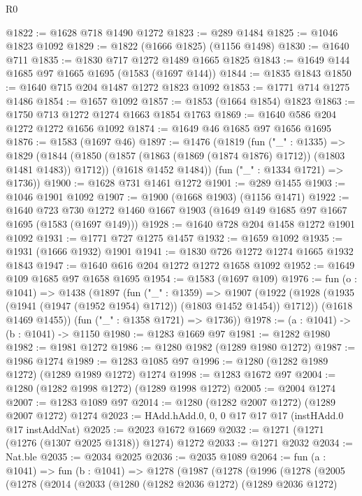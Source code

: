 \begin{lexlean}{R0}
\begin{coremodule}
@1822 := @1628 @718 @1490 @1272
@1823 := @289 @1484
@1825 := @1046 @1823 @1092
@1829 := @1822 (@1666 @1825) (@1156 @1498)
@1830 := @1640 @711
@1835 := @1830 @717 @1272 @1489 @1665 @1825
@1843 := @1649 @144 @1685 @97 @1665 @1695 (@1583 (@1697 @144))
@1844 := @1835 @1843
@1850 := @1640 @715 @204 @1487 @1272 @1823 @1092
@1853 := @1771 @714 @1275 @1486
@1854 := @1657 @1092
@1857 := @1853 (@1664 @1854) @1823
@1863 := @1750 @713 @1272 @1274 @1663 @1854 @1763
@1869 := @1640 @586 @204 @1272 @1272 @1656 @1092
@1874 := @1649 @46 @1685 @97 @1656 @1695
@1876 := @1583 (@1697 @46)
@1897 := @1476
    (@1819
      (fun ("_" : @1335) =>
      @1829
        (@1844 (@1850 (@1857 (@1863 (@1869 (@1874 @1876) @1712)) (@1803 @1481 @1483)) @1712))
        (@1618 @1452 @1484))
      (fun ("_" : @1334 @1721) => @1736))
@1900 := @1628 @731 @1461 @1272
@1901 := @289 @1455
@1903 := @1046 @1901 @1092
@1907 := @1900 (@1668 @1903) (@1156 @1471)
@1922 := @1640
    @723
    @730
    @1272
    @1460
    @1667
    @1903
    (@1649 @149 @1685 @97 @1667 @1695 (@1583 (@1697 @149)))
@1928 := @1640 @728 @204 @1458 @1272 @1901 @1092
@1931 := @1771 @727 @1275 @1457
@1932 := @1659 @1092
@1935 := @1931 (@1666 @1932) @1901
@1941 := @1830 @726 @1272 @1274 @1665 @1932 @1843
@1947 := @1640 @616 @204 @1272 @1272 @1658 @1092
@1952 := @1649 @109 @1685 @97 @1658 @1695
@1954 := @1583 (@1697 @109)
@1976 := fun (o : @1041) =>
  @1438
    (@1897
      (fun ("_" : @1359) =>
      @1907
        (@1922 (@1928 (@1935 (@1941 (@1947 (@1952 @1954) @1712)) (@1803 @1452 @1454)) @1712))
        (@1618 @1469 @1455))
      (fun ("_" : @1358 @1721) => @1736))
@1978 := (a : @1041) -> (b : @1041) -> @1150
@1980 := @1283 @1669 @97
@1981 := @1282 @1980
@1982 := @1981 @1272
@1986 := @1280 @1982 (@1289 @1980 @1272)
@1987 := @1986 @1274
@1989 := @1283 @1085 @97
@1996 := @1280 (@1282 @1989 @1272) (@1289 @1989 @1272) @1274
@1998 := @1283 @1672 @97
@2004 := @1280 (@1282 @1998 @1272) (@1289 @1998 @1272)
@2005 := @2004 @1274
@2007 := @1283 @1089 @97
@2014 := @1280 (@1282 @2007 @1272) (@1289 @2007 @1272) @1274
@2023 := HAdd.hAdd.{0, 0, 0} @17 @17 @17 (instHAdd.{0} @17 instAddNat)
@2025 := @2023 @1672 @1669
@2032 := @1271 (@1271 (@1276 (@1307 @2025 @1318)) @1274) @1272
@2033 := @1271 @2032
@2034 := Nat.ble
@2035 := @2034 @2025
@2036 := @2035 @1089
@2064 := fun (a : @1041) =>
  fun (b : @1041) =>
  @1278
    (@1987
      (@1278
        (@1996
          (@1278
            (@2005
              (@1278
                (@2014
                  (@2033
                    (@1280
                      (@1282 @2036 @1272)
                      (@1289 @2036 @1272)

\end{coremodule}
\end{lexlean}

